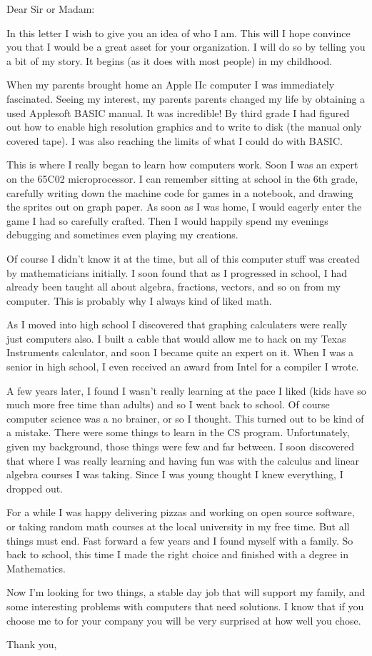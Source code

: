 \documentclass{letter}
\begin{document}
\begin{letter}{}
\opening{Dear Sir or Madam:}

In this letter I wish to give you an idea of who I am. This will I hope convince you that I would be a great asset for your organization. I will do so by telling you a bit of my story. It begins (as it does with most people) in my childhood.

When my parents brought home an Apple IIc computer I was immediately fascinated. Seeing my interest, my parents parents changed my life by obtaining a used Applesoft BASIC manual. It was incredible! By third grade I had figured out how to enable high resolution graphics and to write to disk (the manual only covered tape). I was also reaching the limits of what I could do with BASIC.

This is where I really began to learn how computers work. Soon I was an expert on the 65C02 microprocessor. I can remember sitting at school in the 6th grade, carefully writing down the machine code for games in a notebook, and drawing the sprites out on graph paper. As soon as I was home, I would eagerly enter the game I had so carefully crafted. Then I would happily spend my evenings debugging and sometimes even playing my creations.

Of course I didn't know it at the time, but all of this computer stuff was created by mathematicians initially. I soon found that as I progressed in school, I had already been taught all about algebra, fractions, vectors, and so on from my computer. This is probably why I always kind of liked math.

As I moved into high school I discovered that graphing calculaters were really just computers also. I built a cable that would allow me to hack on my Texas Instruments calculator, and soon I became quite an expert on it. When I was a senior in high school, I even received an award from Intel for a compiler I wrote.

A few years later, I found I wasn't really learning at the pace I liked (kids have so much more free time than adults) and so I went back to school. Of course computer science was a no brainer, or so I thought. This turned out to be kind of a mistake. There were some things to learn in the CS program. Unfortunately, given my background, those things were few and far between. I soon discovered that where I was really learning and having fun was with the calculus and linear algebra courses I was taking. Since I was young thought I knew everything, I dropped out.

For a while I was happy delivering pizzas and working on open source software, or taking random math courses at the local university in my free time. But all things must end. Fast forward a few years and I found myself with a family. So back to school, this time I made the right choice and finished with a degree in Mathematics.

Now I'm looking for two things, a stable day job that will support my family, and some interesting problems with computers that need solutions. I know that if you choose me to for your company you will be very surprised at how well you chose.
\closing{Thank you,}
\end{letter}
\end{document}
